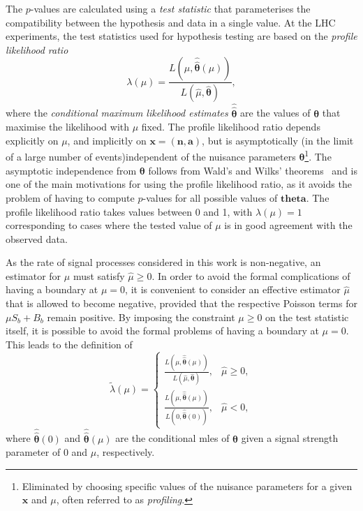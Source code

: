 The $p$-values are calculated using a \textit{test statistic} that parameterises the compatibility between the hypothesis and data in a single value. At the LHC experiments, the test statistics used for hypothesis testing are based on the \textit{profile likelihood ratio}
\begin{equation}
	\lambda(\mu) = \frac{L(\mu,\boldsymbol{\hat{\hat{\theta}}}(\mu))}{L(\hat{\mu},\hat{\boldsymbol{\theta}})},
\end{equation}
where the \textit{conditional maximum likelihood estimates} $\boldsymbol{\hat{\hat{\theta}}}$ are the values of $\boldsymbol{\theta}$ that maximise the likelihood with $\mu$ fixed. The profile likelihood ratio depends explicitly on $\mu$, and implicitly on $\boldsymbol{x} = (\boldsymbol{n},\boldsymbol{a})$, but is asymptotically  (\ie in the limit of a large number of events)independent of the nuisance parameters $\boldsymbol{\theta}$\footnote{Eliminated by choosing specific values of the nuisance parameters for a given $\boldsymbol{x}$ and $\mu$, often referred to as \textit{profiling}.}. The asymptotic independence from $\boldsymbol{\theta}$ follows from Wald's and Wilks' theorems~\cite{wald10.2307/1990256,wilks1938} and is one of the main motivations for using the profile likelihood ratio, as it avoids the problem of having to compute $p$-values for all possible values of $\boldsymbol{theta}$. The profile likelihood ratio takes values between 0 and 1, with $\lambda(\mu) = 1$ corresponding to cases where the tested value of $\mu$ is in good agreement with the observed data.

As the rate of signal processes considered in this work is non-negative, an estimator for $\mu$ must satisfy $\hat{\mu}\geq 0$. In order to avoid the formal complications of having a boundary at $\mu = 0$, it is convenient to consider an effective estimator $\hat{\mu}$ that is allowed to become negative, provided that the respective Poisson terms for $\mu S_b + B_b$ remain positive. By imposing the constraint $\mu \geq 0$ on the test statistic itself, it is possible to avoid the formal problems of having a boundary at $\mu = 0$. This leads to the definition of
\begin{equation}
	\tilde{\lambda}(\mu)= 
\begin{cases}
     \frac{L(\mu,\boldsymbol{\hat{\hat{\theta}}}(\mu))}{L(\hat{\mu},\hat{\boldsymbol{\theta}})}, & \hat{\mu} \geq 0,\\
     \frac{L(\mu,\boldsymbol{\hat{\hat{\theta}}}(\mu))}{L(0,\boldsymbol{\hat{\hat{\theta}}}(0))},              & \hat{\mu} < 0,
\end{cases}
\label{eq:lambda_tilde}
\end{equation}
where $\boldsymbol{\hat{\hat{\theta}}}(0)$ and $\boldsymbol{\hat{\hat{\theta}}}(\mu)$ are the conditional \glspl{mle} of $\boldsymbol{\theta}$ given a signal strength parameter of 0 and $\mu$, respectively. 

